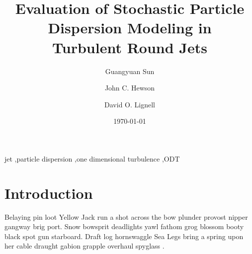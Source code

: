\documentclass[review,3p]{elsarticle}
\begin{document}


\title{Evaluation of Stochastic Particle Dispersion Modeling in \\ Turbulent Round Jets} 

\author[byu]{Guangyuan Sun}
\author[snl]{John C. Hewson}
\author[byu]{David O. Lignell}

\address[byu]{350 CB, Brigham Young University, Provo, UT 84602, USA}
\address[snl]{Fire Science and Technology Department, Sandia National Laboratories, Albuquerque, NM, USA}


\date{\today}


\begin{abstract}

\lipsum[1]     %

\end{abstract}

\begin{keyword} 
jet \sep particle dispersion \sep one dimensional turbulence \sep ODT
\end{keyword}


\maketitle     


\linenumbers

\section{Introduction}      \label{sec:intro}

\lipsum[2]     %

Belaying pin loot Yellow Jack run a shot across the bow plunder provost nipper gangway brig port. Snow bowsprit deadlights yawl \cite{Lignell_2011} fathom grog blossom booty black spot gun starboard. Draft log hornswaggle Sea Legs bring a spring upon her cable draught gabion grapple overhaul spyglass \cite{Ferziger_2002, Cantera_new}.
\end{document}
